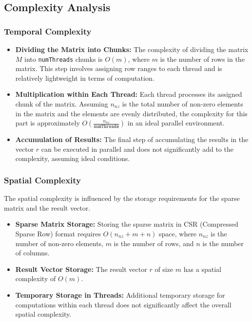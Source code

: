 \documentclass[12pt,oneside]{book} %
\begin{document}
\subsection{Complexity Analysis}
\subsubsection{Temporal Complexity}
\begin{itemize}
    \item \textbf{Dividing the Matrix into Chunks:} The complexity of dividing the matrix \(M\) into \texttt{numThreads} chunks is \(O(m)\), where \(m\) is the number of rows in the matrix. This step involves assigning row ranges to each thread and is relatively lightweight in terms of computation.

    \item \textbf{Multiplication within Each Thread:} Each thread processes its assigned chunk of the matrix. Assuming \(n_{nz}\) is the total number of non-zero elements in the matrix and the elements are evenly distributed, the complexity for this part is approximately \(O\left(\frac{n_{nz}}{\texttt{numThreads}}\right)\) in an ideal parallel environment.

    \item \textbf{Accumulation of Results:} The final step of accumulating the results in the vector \(r\) can be executed in parallel and does not significantly add to the complexity, assuming ideal conditions.
\end{itemize}

\subsubsection{Spatial Complexity}
The spatial complexity is influenced by the storage requirements for the sparse
matrix and the result vector.
\begin{itemize}
    \item \textbf{Sparse Matrix Storage:} Storing the sparse matrix in CSR (Compressed Sparse Row) format requires \(O(n_{nz} + m + n)\) space, where \(n_{nz}\) is the number of non-zero elements, \(m\) is the number of rows, and \(n\) is the number of columns.

    \item \textbf{Result Vector Storage:} The result vector \(r\) of size \(m\) has a spatial complexity of \(O(m)\).

    \item \textbf{Temporary Storage in Threads:} Additional temporary storage for computations within each thread does not significantly affect the overall spatial complexity.
\end{itemize}
\end{document}

